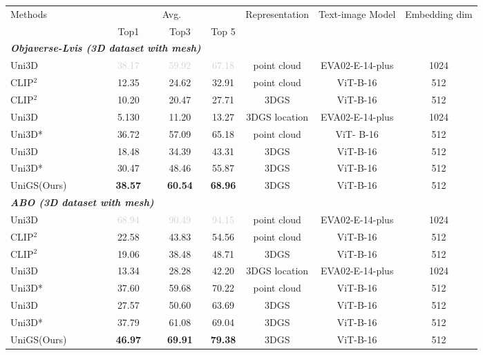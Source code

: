 \begin{table}[t]
		\centering
  \addtolength{\tabcolsep}{-0.5pt}
 \begin{tabularx}{\textwidth}{ l | c c c | c| c |c }
\toprule
\multirow{2}{*}{Methods}  & \multicolumn{3}{c|}{Avg.} & \multirow{2}{*}{Representation} & \multirow{2}{*}{Text-image Model} & \multirow{2}{*}{Embedding dim} \\
  & Top1 & Top3 & Top 5 & & \\
 \midrule  \midrule
    \multicolumn{3}{l}{\textit{\textbf{Objaverse-Lvis (3D dataset with mesh)}}} \\
    \midrule
Uni3D & \textcolor{lightgray}{38.17} & \textcolor{lightgray}{59.92} & \textcolor{lightgray}{67.18} & point cloud & EVA02-E-14-plus & 1024\\
\midrule
CLIP$^2$ & 12.35 & 24.62 & 32.91 & point cloud & ViT-B-16 & 512\\
CLIP$^2$ & 10.20 & 20.47 & 27.71 & 3DGS & ViT-B-16 & 512\\
Uni3D & 5.130 & 11.20 & 13.27 & 3DGS location & EVA02-E-14-plus & 1024\\
Uni3D* & 36.72 & 57.09 & 65.18 & point cloud & ViT- B-16 & 512\\
Uni3D & 18.48 & 34.39 & 43.31 & 3DGS & ViT-B-16 & 512\\
Uni3D* & 30.47 & 48.46 & 55.87 & 3DGS & ViT-B-16 & 512\\
\midrule
\rowcolor{mygray}UniGS(Ours) & \textbf{38.57} & \textbf{60.54} & \textbf{68.96} & 3DGS & ViT-B-16 & 512\\

 \midrule  \midrule
    \multicolumn{3}{l}{\textit{\textbf{ABO (3D dataset with mesh)}}} \\
    \midrule
Uni3D & \textcolor{lightgray}{68.94} & \textcolor{lightgray}{90.49} & \textcolor{lightgray}{94.15} & point cloud & EVA02-E-14-plus & 1024\\
\midrule
 CLIP$^2$ & 22.58 & 43.83 & 54.56 & point cloud & ViT-B-16 & 512\\
CLIP$^2$ & 19.06 & 38.48 & 48.71 & 3DGS & ViT-B-16 & 512\\
 Uni3D & 13.34 & 28.28 & 42.20 & 3DGS location & EVA02-E-14-plus & 1024\\
 Uni3D* & 37.60 & 59.68 & 70.22 & point cloud & ViT-B-16 & 512\\
Uni3D & 27.57 & 50.60 & 63.69 & 3DGS & ViT-B-16 & 512\\
 Uni3D* & 37.79 & 61.08 & 69.04 & 3DGS & ViT-B-16 & 512\\
\midrule
\rowcolor{mygray} UniGS(Ours) & \textbf{46.97} & \textbf{69.91} & \textbf{79.38} & 3DGS & ViT-B-16 & 512\\


\end{tabularx}
\end{table}
